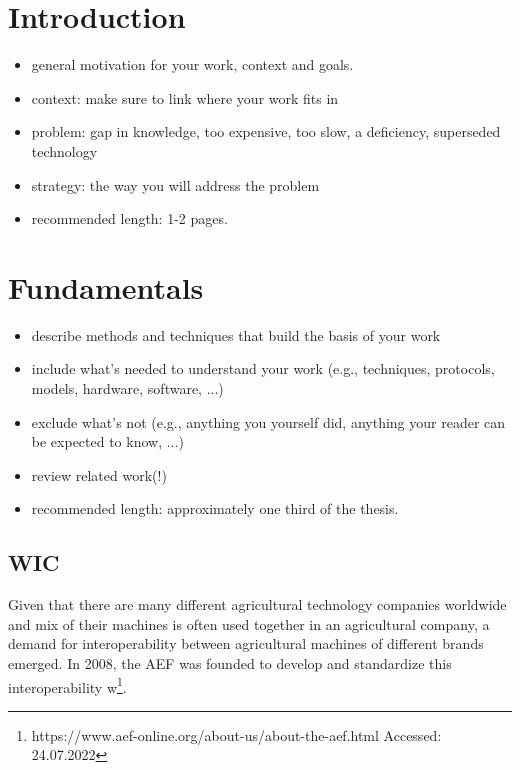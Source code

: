 \documentclass[]{nsm-thesis}
\begin{document}
\cleardoublepage
{}


\chapter{Introduction}
\label{sec:introduction}

\begin{itemize}
\item general motivation for your work, context and goals.
\item context: make sure to link where your work fits in
\item problem: gap in knowledge, too expensive, too slow, a deficiency, superseded technology
\item strategy: the way you will address the problem
\item recommended length: 1-2 pages.
\end{itemize}




\chapter{Fundamentals}
\label{sec:fundamentals}



\begin{itemize}
\item describe methods and techniques that build the basis of your work
\item include what's needed to understand your work (e.g., techniques, protocols, models, hardware, software, ...)
\item exclude what's not (e.g., anything you yourself did, anything your reader can be expected to know, ...)
\item review related work(!)
\item recommended length: approximately one third of the thesis.
\end{itemize}

\section{\acl{WIC}}
Given that there are many different agricultural technology companies worldwide and  mix of their machines is often used together in an agricultural company, a demand for interoperability between agricultural machines of different brands emerged. In 2008, the \ac{AEF} was founded to develop and standardize this interoperability w\footnote{https://www.aef-online.org/about-us/about-the-aef.html Accessed: 24.07.2022}.
\end{document}
